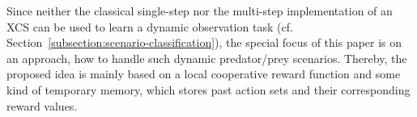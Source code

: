 
Since neither the classical single-step nor the multi-step implementation of an XCS \cite{BW02} can be used to learn a dynamic observation task %
(cf. Section~\ref{subsection:scenario-classification}), the special focus of this paper is on an approach, how to handle such dynamic predator/prey scenarios. Thereby, the proposed idea is mainly based on a local cooperative reward function and some kind of temporary memory, which stores past action sets and their corresponding reward values. %


